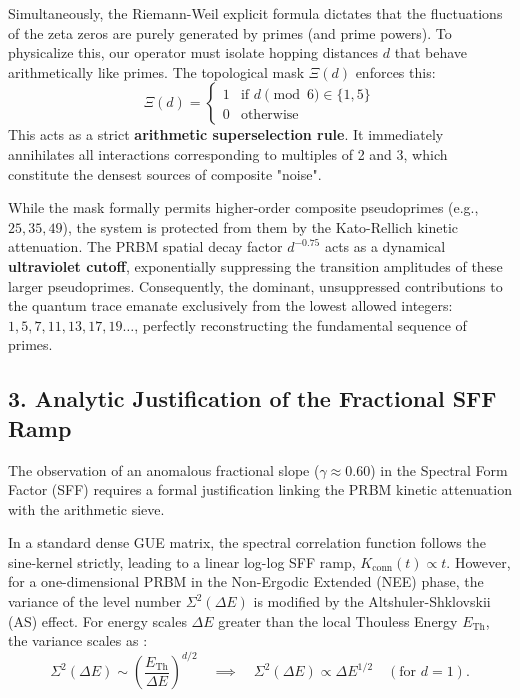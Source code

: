 \documentclass[aps,prl,preprint,superscriptaddress,floatfix]{revtex4-2}
\begin{document}
Simultaneously, the Riemann-Weil explicit formula dictates that the fluctuations of the zeta zeros are purely generated by primes (and prime powers). To physicalize this, our operator must isolate hopping distances $d$ that behave arithmetically like primes. The topological mask $\Xi(d)$ enforces this:
\begin{equation}
\Xi(d) = \begin{cases} 1 & \text{if } d \pmod 6 \in \{1, 5\} \\ 0 & \text{otherwise} \end{cases}
\end{equation}
This acts as a strict \textbf{arithmetic superselection rule}. It immediately annihilates all interactions corresponding to multiples of 2 and 3, which constitute the densest sources of composite "noise". 

While the mask formally permits higher-order composite pseudoprimes (e.g., $25, 35, 49$), the system is protected from them by the Kato-Rellich kinetic attenuation. The PRBM spatial decay factor $d^{-0.75}$ acts as a dynamical \textbf{ultraviolet cutoff}, exponentially suppressing the transition amplitudes of these larger pseudoprimes. Consequently, the dominant, unsuppressed contributions to the quantum trace emanate exclusively from the lowest allowed integers: $1, 5, 7, 11, 13, 17, 19\dots$, perfectly reconstructing the fundamental sequence of primes.

\subsection{3. Analytic Justification of the Fractional SFF Ramp}
The observation of an anomalous fractional slope ($\gamma \approx 0.60$) in the Spectral Form Factor (SFF) requires a formal justification linking the PRBM kinetic attenuation with the arithmetic sieve. 

In a standard dense GUE matrix, the spectral correlation function follows the sine-kernel strictly, leading to a linear log-log SFF ramp, $K_{\text{conn}}(t) \propto t$. However, for a one-dimensional PRBM in the Non-Ergodic Extended (NEE) phase, the variance of the level number $\Sigma^2(\Delta E)$ is modified by the Altshuler-Shklovskii (AS) effect. For energy scales $\Delta E$ greater than the local Thouless Energy $E_{\text{Th}}$, the variance scales as \cite{Kravtsov2015}:
\begin{equation}
\Sigma^2(\Delta E) \sim \left(\frac{E_{\text{Th}}}{\Delta E}\right)^{d/2} \quad \implies \quad \Sigma^2(\Delta E) \propto \Delta E^{1/2} \quad (\text{for } d=1).
\end{equation}
\end{document}
